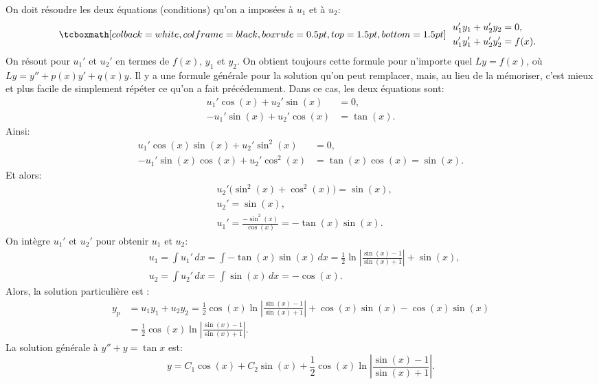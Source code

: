 On doit résoudre les deux équations (conditions) qu'on a imposées à  $u_1$ et à $u_2$:
\begin{equation*}
\mybxbg{~~ \begin{aligned}
				& u_1' y_1 + u_2' y_2 = 0 ,\\
				& u_1' y_1' + u_2' y_2' = f(x) .
		\end{aligned}~~}
\end{equation*}
On résout pour $u_1'$ et $u_2'$ en termes de $f(x)$, $y_1$ et $y_2$.
On obtient toujours cette formule pour n'importe quel $Ly = f(x)$, où $Ly = y''+p(x)y'+q(x)y$.  
Il y a une formule générale pour la solution qu'on peut remplacer, mais, au lieu de la mémoriser, c'est mieux et plus facile de simplement répéter ce qu'on a fait précédemment. Dans ce cas, les deux équations sont:  
\begin{align*}
	 u_1' \cos (x) + u_2' \sin (x) &= 0 ,\\
	-u_1' \sin (x) + u_2' \cos (x) &= \tan (x) .
\end{align*}
Ainsi: 
\begin{align*}
	 u_1' \cos (x) \sin (x) + u_2' \sin^2 (x) & = 0 ,\\
	-u_1' \sin (x) \cos (x) + u_2' \cos^2 (x) & = \tan (x) \cos (x) = \sin (x) .
\end{align*}
Et alors: 
\begin{align*}
	& u_2' \bigl(\sin^2 (x) + \cos^2 (x)\bigr) = \sin (x) , \\
	& u_2' = \sin (x) , \\
	& u_1' = \frac{- \sin^2 (x)}{\cos (x)} = - \tan (x) \sin (x) .
\end{align*}
On intègre $u_1'$ et $u_2'$ pour obtenir $u_1$ et $u_2$: 
\begin{align*}
	& u_1 = \int u_1'\,dx 	= \int - \tan (x) \sin (x)\,dx 
		= \frac{1}{2} \ln \left\lvert \frac{\sin (x)-1}{\sin (x) + 1} \right\rvert 	+ \sin (x) , \\
	& u_2 = \int u_2'\,dx 	= \int \sin (x)\,dx = -\cos (x) .
\end{align*}
Alors, la solution particulière est : 
\begin{align*}
	y_p &= u_1 y_1 + u_2 y_2 =
	\frac12 \cos (x) \ln \left\lvert \frac{\sin (x)-1}{\sin (x) + 1}	\right\rvert
	+ \cos (x) \sin (x) -\cos (x) \sin (x)	\\ 
	&= 	\frac12 \cos (x) \ln \left\lvert \frac{\sin (x)-1}{\sin (x) + 1} \right\rvert .
\end{align*}
La solution générale à  $y'' + y = \tan x$ est: 
\begin{equation*}
	y = C_1 \cos (x) + C_2 \sin (x) + \frac{1}{2} \cos (x) \ln \left\lvert \frac{\sin (x)-1}{\sin (x) + 1}
\right\rvert .
\end{equation*}

